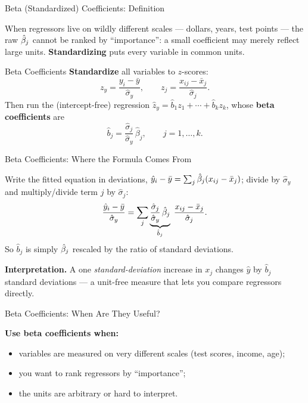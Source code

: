 \documentclass[aspectratio=169, 12pt]{beamer}
\begin{document}
\begin{frame}{Beta (Standardized) Coefficients: Definition}

  When regressors live on wildly different scales --- dollars, years, test points ---
  the raw $\hat{\beta}_j$ cannot be ranked by ``importance'': a small coefficient may merely
  reflect large units. \textbf{Standardizing} puts every variable in common units.

  \begin{definitionbox}{Beta Coefficients}
    \textbf{Standardize} all variables to $z$-scores:
    \[
      z_y = \frac{y_i - \bar{y}}{\hat\sigma_y}, \qquad
      z_j = \frac{x_{ij} - \bar{x}_j}{\hat\sigma_j} .
    \]
    Then run the (intercept-free) regression
    $\hat{z}_y = \hat{b}_1 z_1 + \cdots + \hat{b}_k z_k$, whose \textbf{beta coefficients}
    are
    \[
      \hat{b}_j = \frac{\hat\sigma_j}{\hat\sigma_y}\, \hat\beta_j,
      \qquad j = 1, \ldots, k .
    \]
  \end{definitionbox}

\end{frame}

\begin{frame}{Beta Coefficients: Where the Formula Comes From}

  \begin{keybox}
    Write the fitted equation in deviations,
    $\hat y_i-\bar y=\sum_j \hat{\beta}_j(x_{ij}-\bar x_j)$; divide by $\hat\sigma_y$ and
    multiply/divide term $j$ by $\hat\sigma_j$:
    \[
      \frac{\hat y_i-\bar y}{\hat\sigma_y}
        = \sum_j \underbrace{\frac{\hat\sigma_j}{\hat\sigma_y}\,\hat{\beta}_j}_{\hat b_j}\;
          \frac{x_{ij}-\bar x_j}{\hat\sigma_j} .
    \]
    So $\hat b_j$ is simply $\hat{\beta}_j$ rescaled by the ratio of standard deviations.
  \end{keybox}

  \medskip

  \begin{highlightbox}
    \textbf{Interpretation.} A one \emph{standard-deviation} increase in $x_j$ changes
    $\hat y$ by $\hat b_j$ standard deviations --- a unit-free measure that lets you
    compare regressors directly.
  \end{highlightbox}

\end{frame}

\begin{frame}{Beta Coefficients: When Are They Useful?}

  \begin{keybox}
    \textbf{Use beta coefficients when:}
    \begin{itemize}
      \item variables are measured on very different scales (test scores, income, age);
      \item you want to rank regressors by ``importance'';
      \item the units are arbitrary or hard to interpret.
    \end{itemize}
  \end{keybox}

\end{frame}
\end{document}

